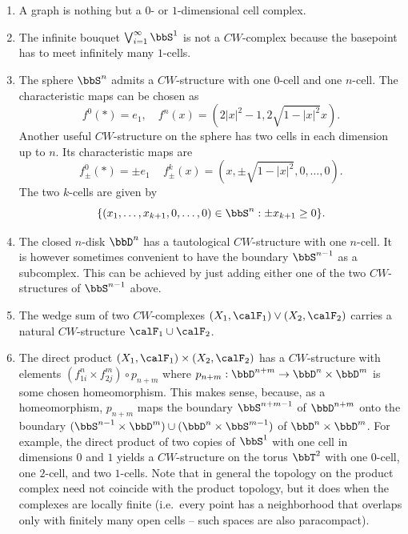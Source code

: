 \begin{example}
    \begin{enumerate}
        \item A graph is nothing but a $0$- or $1$-dimensional cell complex.
        \item The infinite bouquet $\bigvee_{i=1}^\infty \bbS^1$ is not a $CW$-complex because the basepoint has to meet infinitely many $1$-cells.
        \item The sphere $\bbS^n$ admits a $CW$-structure with one $0$-cell and one $n$-cell. The characteristic maps can be chosen as 
        \[f^0(*)=e_1,\quad f^n(x)=(2|x|^2-1,2\sqrt{1-|x|^2}x).\]
        Another useful $CW$-structure on the sphere has two cells in each dimension up to $n$. Its characteristic maps are
        \[f^0_\pm (*)=\pm e_1\,\quad f^k_\pm(x)=(x,\pm\sqrt{1-|x|^2},0,\ldots,0).\]
        The two $k$-cells are given by
        \[\{(x_1,\ldots,x_{k+1},0,\ldots,0)\in \bbS^n:\pm x_{k+1}\geq 0\}.\]
        \item The closed $n$-disk $\bbD^n$ has a tautological $CW$-structure with one $n$-cell. It is however sometimes convenient to have the boundary $\bbS^{n-1}$ as a subcomplex. This can be achieved by just adding either one of the two $CW$-structures of $\bbS^{n-1}$ above.
        \item The wedge sum of two $CW$-complexes $(X_1,\calF _1)\vee (X_2,\calF _2)$ carries a natural $CW$-structure $\calF _1\cup \calF _2$.
        \item The direct product $(X_1,\calF _1)\times (X_2,\calF _2)$ has a $CW$-structure with elements $(f_{1i}^n\times f_{2j}^m)\circ p_{n+m}$ where $p_{n+m}:\bbD^{n+m}\to \bbD^n\times \bbD^m$ is some chosen homeomorphism. This makes sense, because, as a homeomorphism, $p_{n+m}$ maps the boundary $\bbS^{n+m-1}$ of $\bbD^{n+m}$ onto the boundary $(\bbS^{n-1}\times \bbD^m)\cup (\bbD^n\times \bbS^{m-1})$ of $\bbD^n\times \bbD^m$. For example, the direct product of two copies of $\bbS^1$ with one cell in dimensions $0$ and $1$ yields a $CW$-structure on the torus $\bbT^2$ with one $0$-cell, one $2$-cell, and two $1$-cells. Note that in general the topology on the product complex need not coincide with the product topology, but it does when the complexes are locally finite (i.e.\ every point has a neighborhood that overlaps only with finitely many open cells -- such spaces are also paracompact).
    \end{enumerate}
\end{example}

